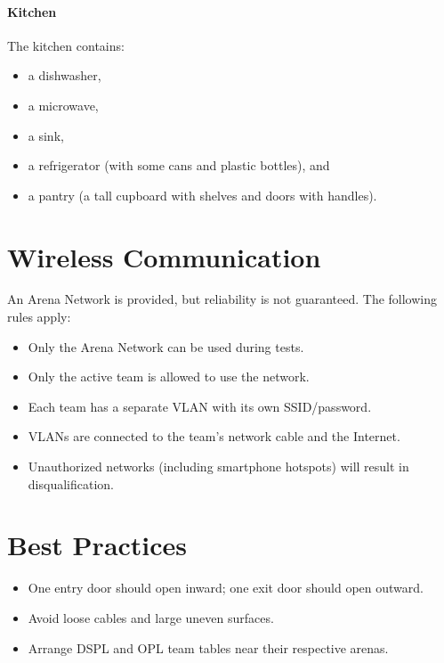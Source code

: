 \paragraph{Kitchen} The kitchen contains:
\begin{itemize}
    \item a dishwasher,
    \item a microwave,
    \item a sink,
    \item a refrigerator (with some cans and plastic bottles), and
    \item a pantry (a tall cupboard with shelves and doors with handles).
\end{itemize}

\section{Wireless Communication}
An Arena Network is provided, but reliability is not guaranteed. The following rules apply:
\begin{itemize}
    \item Only the Arena Network can be used during tests.
    \item Only the active team is allowed to use the network.
    \item Each team has a separate VLAN with its own SSID/password.
    \item VLANs are connected to the team’s network cable and the Internet.
    \item Unauthorized networks (including smartphone hotspots) will result in disqualification.
\end{itemize}

\section{Best Practices}
\begin{itemize}
    \item One entry door should open inward; one exit door should open outward.
    \item Avoid loose cables and large uneven surfaces.
    \item Arrange DSPL and OPL team tables near their respective arenas.
\end{itemize}

